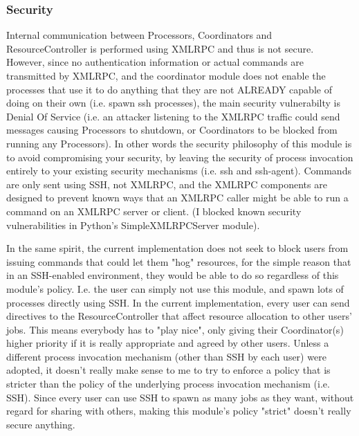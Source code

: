 \documentclass{howto}
\begin{document}
\subsubsection{Security}

Internal communication between Processors, Coordinators and ResourceController is performed using XMLRPC and thus is not secure. However, since no authentication information or actual commands are transmitted by XMLRPC, and the coordinator module does not enable the processes that use it to do anything that they are not ALREADY capable of doing on their own (i.e. spawn ssh processes), the main security vulnerabilty is Denial Of Service (i.e. an attacker listening to the XMLRPC traffic could send messages causing Processors to shutdown, or Coordinators to be blocked from running any Processors).  In other words the security philosophy of this module is to avoid compromising your security, by leaving the security of process invocation entirely to your existing security mechanisms (i.e. ssh and ssh-agent).  Commands are only sent using SSH, not XMLRPC, and the XMLRPC components are designed to prevent known ways that an XMLRPC caller might be able to run a command on an XMLRPC server or client. (I blocked known security vulnerabilities in Python's SimpleXMLRPCServer module).

In the same spirit, the current implementation does not seek to block users from issuing commands that could let them "hog" resources, for the simple reason that in an SSH-enabled environment, they would be able to do so regardless of this module's policy.  I.e. the user can simply not use this module, and spawn lots of processes directly using SSH.  In the current implementation, every user can send directives to the ResourceController that affect resource allocation to other users' jobs.  This means everybody has to "play nice", only giving their Coordinator(s) higher priority if it is really appropriate and agreed by other users.  Unless a different process invocation mechanism (other than SSH by each user) were adopted, it doesn't really make sense to me to try to enforce a policy that is stricter than the policy of the underlying process invocation mechanism (i.e. SSH).  Since every user can use SSH to spawn as many jobs as they want, without regard for sharing with others, making this module's policy "strict" doesn't really secure anything.
\end{document}
